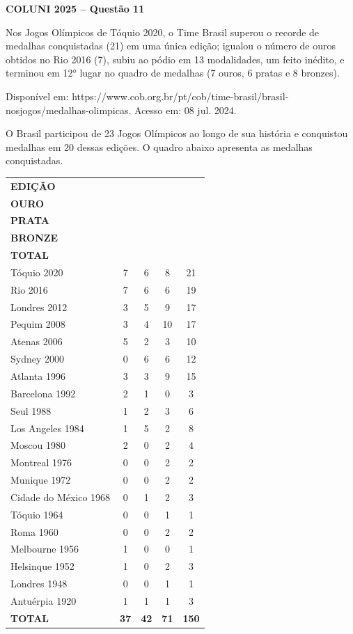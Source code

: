 \textbf{COLUNI 2025 -- Questão 11}\par\medskip Nos Jogos Olímpicos de Tóquio 2020, o Time Brasil superou o recorde de medalhas conquistadas (21) em uma única edição; igualou o número de ouros obtidos no Rio 2016 (7), subiu ao pódio em 13 modalidades, um feito inédito, e terminou em 12° lugar no quadro de medalhas (7 ouros, 6 pratas e 8 bronzes).\par

\noindent Disponível em: https://www.cob.org.br/pt/cob/time-brasil/brasil-nosjogos/medalhas-olimpicas. Acesso em: 08 jul. 2024.

\par

O Brasil participou de 23 Jogos Olímpicos ao longo de sua história e conquistou medalhas em 20 dessas edições. O quadro abaixo apresenta as medalhas conquistadas.

\begin{center}
\begin{tabular}{|l|c|c|c|c|}
\hline
\textbf{EDIÇÃO} & \shortstack{\textbf{MEDALHAS}\\\textbf{OURO}} & \shortstack{\textbf{MEDALHAS}\\\textbf{PRATA}} & \shortstack{\textbf{MEDALHAS}\\\textbf{BRONZE}} & \shortstack{\textbf{MEDALHAS}\\\textbf{TOTAL}} \\
\hline
Tóquio 2020 & 7 & 6 & 8 & 21 \\
Rio 2016 & 7 & 6 & 6 & 19 \\
Londres 2012 & 3 & 5 & 9 & 17 \\
Pequim 2008 & 3 & 4 & 10 & 17 \\
Atenas 2006 & 5 & 2 & 3 & 10 \\
Sydney 2000 & 0 & 6 & 6 & 12 \\
Atlanta 1996 & 3 & 3 & 9 & 15 \\
Barcelona 1992 & 2 & 1 & 0 & 3 \\
Seul 1988 & 1 & 2 & 3 & 6 \\
Los Angeles 1984 & 1 & 5 & 2 & 8 \\
Moscou 1980 & 2 & 0 & 2 & 4 \\
Montreal 1976 & 0 & 0 & 2 & 2 \\
Munique 1972 & 0 & 0 & 2 & 2 \\
Cidade do México 1968 & 0 & 1 & 2 & 3 \\
Tóquio 1964 & 0 & 0 & 1 & 1 \\
Roma 1960 & 0 & 0 & 2 & 2 \\
Melbourne 1956 & 1 & 0 & 0 & 1 \\
Helsinque 1952 & 1 & 0 & 2 & 3 \\
Londres 1948 & 0 & 0 & 1 & 1 \\
Antuérpia 1920 & 1 & 1 & 1 & 3 \\
\textbf{TOTAL} & \textbf{37} & \textbf{42} & \textbf{71} & \textbf{150} \\
\hline
\end{tabular}
\end{center}

